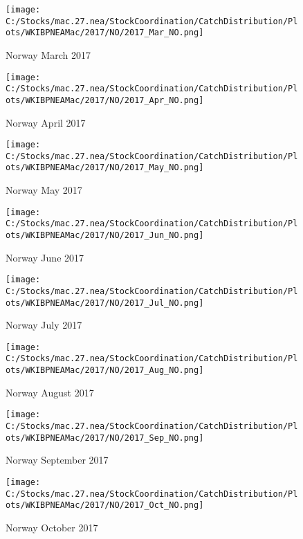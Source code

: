 \documentclass{article}
\begin{document}
\begin{figure}
	\centering
		\texttt{[image: C:/Stocks/mac.27.nea/StockCoordination/CatchDistribution/Plots/WKIBPNEAMac/2017/NO/2017\_Mar\_NO.png]}
	\caption{Norway March 2017}
	\label{fig:2017_Mar_NO}
\end{figure}

\begin{figure}
	\centering
		\texttt{[image: C:/Stocks/mac.27.nea/StockCoordination/CatchDistribution/Plots/WKIBPNEAMac/2017/NO/2017\_Apr\_NO.png]}
	\caption{Norway April 2017}
	\label{fig:2017_Apr_NO}
\end{figure}

\begin{figure}
	\centering
		\texttt{[image: C:/Stocks/mac.27.nea/StockCoordination/CatchDistribution/Plots/WKIBPNEAMac/2017/NO/2017\_May\_NO.png]}
	\caption{Norway May 2017}
	\label{fig:2017_May_NO}
\end{figure}

\begin{figure}
	\centering
		\texttt{[image: C:/Stocks/mac.27.nea/StockCoordination/CatchDistribution/Plots/WKIBPNEAMac/2017/NO/2017\_Jun\_NO.png]}
	\caption{Norway June 2017}
	\label{fig:2017_Jun_NO}
\end{figure}

\begin{figure}
	\centering
		\texttt{[image: C:/Stocks/mac.27.nea/StockCoordination/CatchDistribution/Plots/WKIBPNEAMac/2017/NO/2017\_Jul\_NO.png]}
	\caption{Norway July 2017}
	\label{fig:2017_Jul_NO}
\end{figure}

\begin{figure}
	\centering
		\texttt{[image: C:/Stocks/mac.27.nea/StockCoordination/CatchDistribution/Plots/WKIBPNEAMac/2017/NO/2017\_Aug\_NO.png]}
	\caption{Norway August 2017}
	\label{fig:2017_Aug_NO}
\end{figure}

\begin{figure}
	\centering
		\texttt{[image: C:/Stocks/mac.27.nea/StockCoordination/CatchDistribution/Plots/WKIBPNEAMac/2017/NO/2017\_Sep\_NO.png]}
	\caption{Norway September 2017}
	\label{fig:2017_Sep_NO}
\end{figure}

\begin{figure}
	\centering
		\texttt{[image: C:/Stocks/mac.27.nea/StockCoordination/CatchDistribution/Plots/WKIBPNEAMac/2017/NO/2017\_Oct\_NO.png]}
	\caption{Norway October 2017}
	\label{fig:2017_Oct_NO}
\end{figure}
\end{document}
